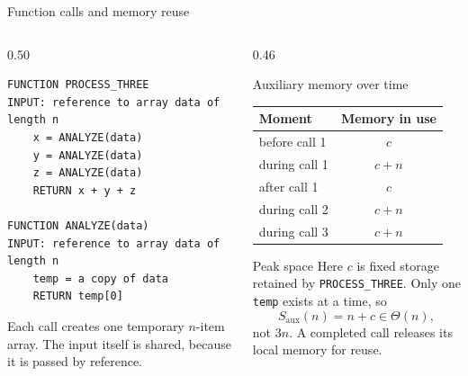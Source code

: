 \documentclass[aspectratio=169]{beamer}
\begin{document}
\begin{frame}[fragile]{Function calls and memory reuse}
  \scriptsize
  \begin{columns}[T]
    \begin{column}{0.50\textwidth}
\begin{lstlisting}[style=pseudo,basicstyle=\ttfamily]
FUNCTION PROCESS_THREE
INPUT: reference to array data of length n
    x = ANALYZE(data)
    y = ANALYZE(data)
    z = ANALYZE(data)
    RETURN x + y + z
    
FUNCTION ANALYZE(data)
INPUT: reference to array data of length n
    temp = a copy of data
    RETURN temp[0]
\end{lstlisting}
      Each call creates one temporary $n$-item array. The input itself is
      shared, because it is passed by reference.
    \end{column}
    \begin{column}{0.46\textwidth}
      \begin{block}{Auxiliary memory over time}
        \centering
        \begin{tabular}{l|c}
          \toprule
          Moment & Memory in use \\
          \midrule
          before call 1 & $c$ \\
          during call 1 & $c+n$ \\
          after call 1 & $c$ \\
          during call 2 & $c+n$ \\
          during call 3 & $c+n$ \\
          \bottomrule
        \end{tabular}
      \end{block}
      \begin{exampleblock}{Peak space}
        Here $c$ is fixed storage retained by \texttt{PROCESS\_THREE}. Only one
        \texttt{temp} exists at a time, so
        \[
          S_{\mathrm{aux}}(n)=n+c\in\Theta(n),
        \]
        not $3n$. A completed call releases its local memory for reuse.
      \end{exampleblock}
    \end{column}
  \end{columns}
\end{frame}
\end{document}
